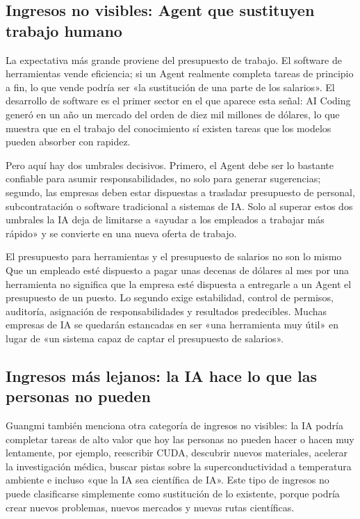 \documentclass[a4paper]{article}
\begin{document}
\subsection{Ingresos no visibles: Agent que sustituyen trabajo humano}

La expectativa más grande proviene del presupuesto de trabajo. El software de herramientas vende eficiencia; si un Agent realmente completa tareas de principio a fin, lo que vende podría ser «la sustitución de una parte de los salarios». El desarrollo de software es el primer sector en el que aparece esta señal: AI Coding generó en un año un mercado del orden de diez mil millones de dólares, lo que muestra que en el trabajo del conocimiento sí existen tareas que los modelos pueden absorber con rapidez.

Pero aquí hay dos umbrales decisivos. Primero, el Agent debe ser lo bastante confiable para asumir responsabilidades, no solo para generar sugerencias; segundo, las empresas deben estar dispuestas a trasladar presupuesto de personal, subcontratación o software tradicional a sistemas de IA. Solo al superar estos dos umbrales la IA deja de limitarse a «ayudar a los empleados a trabajar más rápido» y se convierte en una nueva oferta de trabajo.

\begin{warningbox}{El presupuesto para herramientas y el presupuesto de salarios no son lo mismo}
Que un empleado esté dispuesto a pagar unas decenas de dólares al mes por una herramienta no significa que la empresa esté dispuesta a entregarle a un Agent el presupuesto de un puesto. Lo segundo exige estabilidad, control de permisos, auditoría, asignación de responsabilidades y resultados predecibles. Muchas empresas de IA se quedarán estancadas en ser «una herramienta muy útil» en lugar de «un sistema capaz de captar el presupuesto de salarios».
\end{warningbox}

\subsection{Ingresos más lejanos: la IA hace lo que las personas no pueden}

Guangmi también menciona otra categoría de ingresos no visibles: la IA podría completar tareas de alto valor que hoy las personas no pueden hacer o hacen muy lentamente, por ejemplo, reescribir CUDA, descubrir nuevos materiales, acelerar la investigación médica, buscar pistas sobre la superconductividad a temperatura ambiente e incluso «que la IA sea científica de IA». Este tipo de ingresos no puede clasificarse simplemente como sustitución de lo existente, porque podría crear nuevos problemas, nuevos mercados y nuevas rutas científicas.
\end{document}
